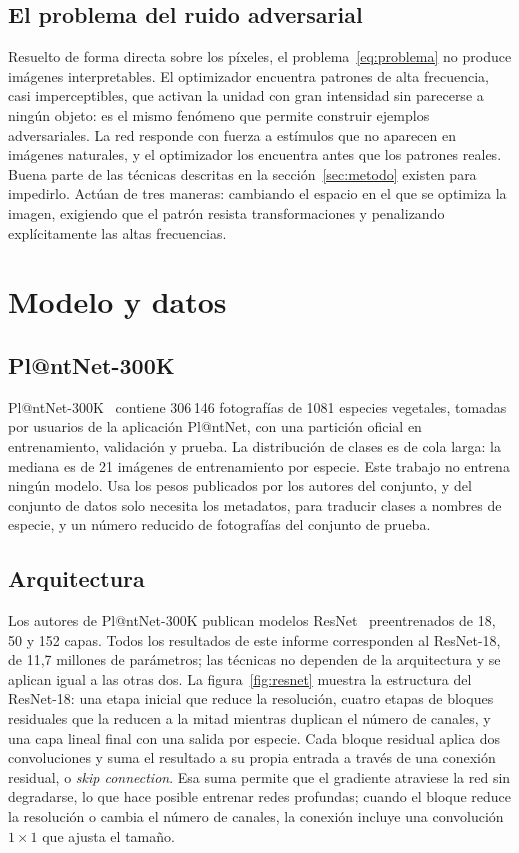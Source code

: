 \documentclass[11pt,a4paper]{article}
\begin{document}
\subsection{El problema del ruido adversarial}

Resuelto de forma directa sobre los píxeles, el
problema~\eqref{eq:problema} no produce imágenes interpretables. El
optimizador encuentra patrones de alta frecuencia, casi imperceptibles, que
activan la unidad con gran intensidad sin parecerse a ningún objeto: es el
mismo fenómeno que permite construir ejemplos adversariales. La red responde
con fuerza a estímulos que no aparecen en imágenes naturales, y el
optimizador los encuentra antes que los patrones reales. Buena parte de las
técnicas descritas en la sección~\ref{sec:metodo} existen para impedirlo.
Actúan de tres maneras: cambiando el espacio en el que se optimiza la
imagen, exigiendo que el patrón resista transformaciones y penalizando
explícitamente las altas frecuencias.

\section{Modelo y datos}
\label{sec:modelo}

\subsection{Pl@ntNet-300K}

Pl@ntNet-300K~\cite{plantnet} contiene 306\,146 fotografías de 1081 especies
vegetales, tomadas por usuarios de la aplicación Pl@ntNet, con una partición
oficial en entrenamiento, validación y prueba. La distribución de clases es
de cola larga: la mediana es de 21 imágenes de entrenamiento por especie. Este trabajo no entrena ningún modelo. Usa los pesos
publicados por los autores del conjunto, y del conjunto de datos solo
necesita los metadatos, para traducir clases a nombres de especie, y un
número reducido de fotografías del conjunto de prueba.

\subsection{Arquitectura}

Los autores de Pl@ntNet-300K publican modelos ResNet~\cite{resnet}
preentrenados de 18, 50 y 152 capas. Todos los resultados de este informe
corresponden al ResNet-18, de 11,7 millones de parámetros; las técnicas no
dependen de la arquitectura y se aplican igual a las otras dos. La
figura~\ref{fig:resnet} muestra la estructura del ResNet-18: una etapa
inicial que reduce la resolución, cuatro etapas de bloques residuales que
la reducen a la mitad mientras duplican el número de canales, y una capa
lineal final con una salida por especie. Cada bloque residual aplica dos
convoluciones y suma el resultado a su propia entrada a través de una
conexión residual, o \emph{skip connection}. Esa suma permite que el
gradiente atraviese la red sin degradarse, lo que hace posible entrenar
redes profundas; cuando el bloque reduce la resolución o cambia el número
de canales, la conexión incluye una convolución $1 \times 1$ que ajusta el
tamaño.
\end{document}
